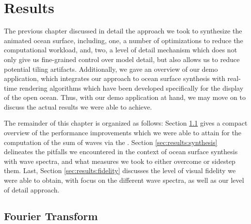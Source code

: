 \chapter{Results}
\label{ch:results}
%

The previous chapter discussed in detail the approach we took to synthesize
the animated ocean surface, including, one, a number of optimizations to reduce
the computational workload, and, two, a level of detail mechanism which does
not only give us fine-grained control over model detail, but also allows us to
reduce potential tiling artifacts. Additionally, we gave an overview of our demo
application, which integrates our approach to ocean surface synthesis
with real-time rendering algorithms which have been developed specifically for
the display of the open ocean.
Thus, with our demo application at hand, we may move on to discuss the
actual results we were able to achieve.

The remainder of this chapter is organized as follows:
Section \ref{sec:results:fft} gives a compact overview of the performance
improvements which we were able to attain for the computation of the sum
of waves via the \InvFourierTransform.
Section \ref{sec:results:synthesis} delineates the pitfalls we encountered
in the context of ocean surface synthesis with wave spectra, and what measures
we took to either overcome or sidestep them.
Last, Section \ref{sec:results:fidelity} discusses the level of visual fidelity
we were able to obtain, with focus on the different wave spectra, as well as
our level of detail approach.


\section{Fourier Transform}
\label{sec:results:fft}
%


